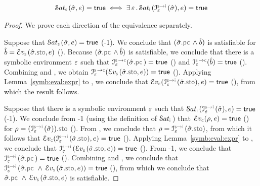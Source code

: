 \begin{lemma}\label{lemma:soundiness:sat}
$$
\begin{array}{l}
      \abssat{\symbolic}(\sstate, \jsilexpr) = \jtrue   
      \iff  \exists \, \senv \, . \, 
          \abssat{\instrumented}(\interpret{\symbinst}{\senv}(\sstate), \jsilexpr) = \jtrue
\end{array}
$$
\end{lemma}
\begin{proof}
We prove each direction of the equivalence separately. 
\vspace{5pt}

\noindent {} 
Suppose that $\abssat{\symbolic}(\sstate, \jsilexpr) = \jtrue$ (\hyp{1}).
We conclude that $(\sstate.\pcsel \wedge \sexprb)$ is satisfiable for 
$\sexprb = \evalexpr{\symbolic}(\sstate.\stosel, \jsilexpr)$ (). 
Because  $(\sstate.\pcsel \wedge \sexprb)$  is satisfiable, we conclude that 
there is a symbolic environment $\varepsilon$ such that $\interpret{\symbconc}{\senv}(\sstate.\pcsel) = \jtrue$ ()
and  $\interpret{\symbconc}{\senv}(\sexprb) = \jtrue$ (). 
Combining  and , we obtain $\interpret{\symbconc}{\senv}(\evalexpr{\symbolic}(\sstate.\stosel, \jsilexpr)) = \jtrue$  (). 
Applying Lemma~\ref{symb:eval:expr} to , we conclude that
$\evalexpr{\concrete}(\interpret{\symbinst}{\senv}(\sstate.\stosel), \jsilexpr) = \jtrue$ (), 
from which the result follows. 
\vspace{3pt}

\noindent {} 
Suppose that there is a symbolic environment $\varepsilon$ such that 
$\abssat{\instrumented}(\interpret{\symbinst}{\senv}(\sstate), \jsilexpr) = \jtrue$ (\hyp{1}). 
We conclude from \hyp{1} (using the definition of $\abssat{\instrumented}$) that 
$\evalexpr{\concrete}(\store, \jsilexpr) = \jtrue$ () for 
$\store = (\interpret{\symbinst}{\senv}(\sstate)).\stosel$ (). 
From , we conclude that $\store = \interpret{\symbinst}{\senv}(\sstate.\stosel)$, 
from which it follows that 
$\evalexpr{\concrete}(\interpret{\symbinst}{\senv}(\sstate.\stosel), \jsilexpr) = \jtrue$ (). 
Applying Lemma~\ref{symb:eval:expr} to , we conclude that
$\interpret{\symbinst}{\senv}(\evalexpr{\symbolic}(\sstate.\stosel, \jsilexpr)) = \jtrue$ ().
 From \hyp{1}, we conclude that $\interpret{\symbinst}{\senv}(\sstate.\pcsel) = \jtrue$ (). 
 Combining  and , we conclude that $\interpret{\symbinst}{\senv}(\sstate.\pcsel \, \wedge \, \evalexpr{\symbolic}(\sstate.\stosel, \jsilexpr)) = \jtrue$ (), 
 from which we conclude that $\sstate.\pcsel \, \wedge \, \evalexpr{\symbolic}(\sstate.\stosel, \jsilexpr)$ is satisfiable. 
\end{proof}


